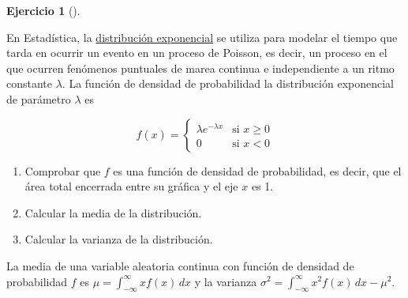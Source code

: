\documentclass[
  spanish,
  a4paper,
]{scrreport}
\theoremstyle{definition}
\newtheorem{exercise}{Ejercicio}[chapter]
\theoremstyle{remark}
\begin{document}
\begin{exercise}[]\protect\hypertarget{exr-distribucion-exponencial}{}\label{exr-distribucion-exponencial}

En Estadística, la
\href{https://es.wikipedia.org/wiki/Distribuci\%C3\%B3n_exponencial}{distribución
exponencial} se utiliza para modelar el tiempo que tarda en ocurrir un
evento en un proceso de Poisson, es decir, un proceso en el que ocurren
fenómenos puntuales de marea continua e independiente a un ritmo
constante \(\lambda\). La función de densidad de probabilidad la
distribución exponencial de parámetro \(\lambda\) es

\[
f(x) = 
\begin{cases}
\lambda e^{-\lambda x} & \mbox{si $x\geq 0$}\\
0 & \mbox{si $x<0$}
\end{cases}
\]

\begin{enumerate}
\def\labelenumi{\alph{enumi}.}
\item
  Comprobar que \(f\) es una función de densidad de probabilidad, es
  decir, que el área total encerrada entre su gráfica y el eje \(x\) es
  1.
\item
  Calcular la media de la distribución.
\item
  Calcular la varianza de la distribución.
\end{enumerate}

\end{exercise}

\begin{tcolorbox}[enhanced jigsaw, arc=.35mm, bottomrule=.15mm, bottomtitle=1mm, breakable, colback=white, colbacktitle=quarto-callout-note-color!10!white, colframe=quarto-callout-note-color-frame, coltitle=black, left=2mm, leftrule=.75mm, opacityback=0, opacitybacktitle=0.6, rightrule=.15mm, title=\textcolor{quarto-callout-note-color}{\faInfo}\hspace{0.5em}{Pista}, titlerule=0mm, toprule=.15mm, toptitle=1mm]

La media de una variable aleatoria continua con función de densidad de
probabilidad \(f\) es \(\mu = \int_{-\infty}^\infty xf(x)\,dx\) y la
varianza \(\sigma^2 = \int_{-\infty}^\infty x^2f(x)\,dx-\mu^2\).

\end{tcolorbox}
\end{document}
